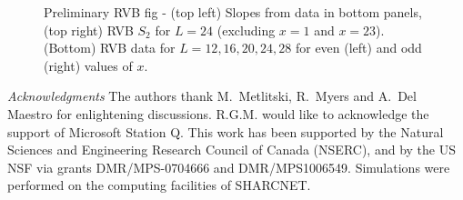 \documentclass[prl,aps,twocolumn,floatfix,amsmath,amssymb,superscriptaddress,tightenlines]{revtex4}
\begin{document}
 \begin{figure}[ht]
   \begin{center}
   \end{center}
   \caption{Preliminary RVB fig - (top left) Slopes from data in bottom panels, (top right) RVB $S_2$ for $L=24$ (excluding $x=1$ and $x=23$). (Bottom) RVB data for $L=12,16,20,24,28$ for even (left) and odd (right) values of $x$.}
   \label{fig:2}
 \end{figure}

{\it Acknowledgments} 
The authors thank M.~Metlitski, R.~Myers and A.~Del Maestro for enlightening discussions. 
R.G.M. would like to acknowledge the support of Microsoft Station Q.
This work has been supported by the Natural Sciences and Engineering
Research Council of Canada (NSERC), and by the US NSF via grants DMR/MPS-0704666 and DMR/MPS1006549.  Simulations were performed on the computing facilities of SHARCNET.



\end{document}
